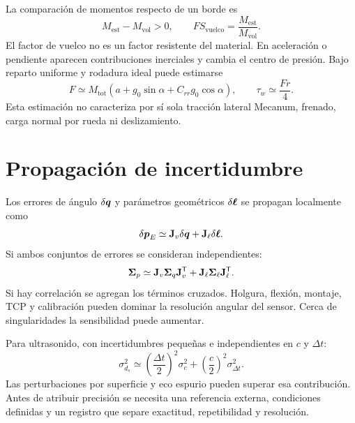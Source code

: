 La comparación de momentos respecto de un borde es
\begin{equation}
M_{\mathrm{est}}-M_{\mathrm{vol}}>0,
\qquad FS_{\mathrm{vuelco}}=\frac{M_{\mathrm{est}}}{M_{\mathrm{vol}}}.
\end{equation}
El factor de vuelco no es un factor resistente del material. En aceleración o pendiente aparecen contribuciones inerciales y cambia el centro de presión. Bajo reparto uniforme y rodadura ideal puede estimarse
\begin{equation}
F\simeq M_{\mathrm{tot}}\left(a+g_0\sin\alpha+C_{rr}g_0\cos\alpha\right),
\qquad\tau_w\simeq\frac{Fr}{4}.
\end{equation}
Esta estimación no caracteriza por sí sola tracción lateral Mecanum, frenado, carga normal por rueda ni deslizamiento.

\section{Propagación de incertidumbre}
Los errores de ángulo $\delta\boldsymbol{q}$ y parámetros geométricos $\delta\boldsymbol{\ell}$ se propagan localmente como
\begin{equation}
\delta\boldsymbol{p}_E\simeq\mathbf{J}_v\delta\boldsymbol{q}+\mathbf{J}_\ell\delta\boldsymbol{\ell}.
\end{equation}
Si ambos conjuntos de errores se consideran independientes:
\begin{equation}
\mathbf{\Sigma}_p\simeq\mathbf{J}_v\mathbf{\Sigma}_q\mathbf{J}_v^{\mathsf{T}}
+\mathbf{J}_\ell\mathbf{\Sigma}_\ell\mathbf{J}_\ell^{\mathsf{T}}.
\end{equation}
Si hay correlación se agregan los términos cruzados. Holgura, flexión, montaje, TCP y calibración pueden dominar la resolución angular del sensor. Cerca de singularidades la sensibilidad puede aumentar.

Para ultrasonido, con incertidumbres pequeñas e independientes en $c$ y $\Delta t$:
\begin{equation}
\sigma_{d_s}^2\simeq\left(\frac{\Delta t}{2}\right)^2\sigma_c^2
+\left(\frac c2\right)^2\sigma_{\Delta t}^2.
\end{equation}
Las perturbaciones por superficie y eco espurio pueden superar esa contribución. Antes de atribuir precisión se necesita una referencia externa, condiciones definidas y un registro que separe exactitud, repetibilidad y resolución.
\FloatBarrier

